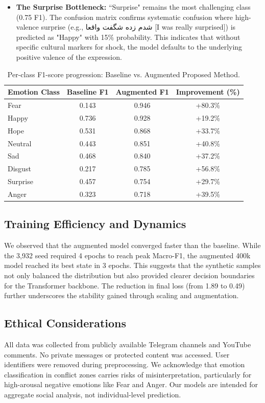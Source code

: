 \documentclass[runningheads]{llncs}
\newcommand{\textfarsi}[1]{{\foreignlanguage{arabic}{#1}}\xspace}
\begin{document}
\begin{itemize}
\item \textbf{The Surprise Bottleneck:} ``Surprise" remains the most challenging 
class (0.75 F1). The confusion matrix confirms systematic confusion where 
high-valence surprise (e.g., \textfarsi{شدم زده شگفت واقعا} [I was really surprised]) is  predicted as "Happy"  with 15\% probability. This 
indicates that without specific cultural markers for shock, the model defaults 
to the underlying positive valence of the expression.
\end{itemize}

\begin{table}[htbp]
\centering
\caption{Per-class F1-score progression: Baseline vs. Augmented Proposed Method.}
\label{tab:class_f1}
\begin{tabular}{@{}lccc@{}}
\toprule
\textbf{Emotion Class} & \textbf{Baseline F1} & \textbf{Augmented F1} & \textbf{Improvement (\%)} \\ \midrule
Fear & 0.143 & 0.946 & +80.3\% \\
Happy & 0.736 & 0.928 & +19.2\% \\
Hope & 0.531 & 0.868 & +33.7\% \\
Neutral & 0.443 & 0.851 & +40.8\% \\
Sad & 0.468 & 0.840 & +37.2\% \\
Disgust & 0.217 & 0.785 & +56.8\% \\
Surprise & 0.457 & 0.754 & +29.7\% \\
Anger & 0.323 & 0.718 & +39.5\% \\ \bottomrule
\end{tabular}
\end{table}
\subsection{Training Efficiency and Dynamics}
We observed that the augmented model converged faster than the baseline. While the 3,932 seed required 4 epochs to reach peak Macro-F1, the augmented 400k model reached its best state in 3 epochs. This suggests that the synthetic samples not only balanced the distribution but also provided clearer decision boundaries for the Transformer backbone. The reduction in final loss (from 1.89 to 0.49) further underscores the stability gained through scaling and augmentation.
\subsection{Ethical Considerations}
All data was collected from publicly available Telegram channels and YouTube 
comments. No private messages or protected content was accessed. User 
identifiers were removed during preprocessing. We acknowledge that emotion 
classification in conflict zones carries risks of misinterpretation, 
particularly for high-arousal negative emotions like Fear and Anger. Our 
models are intended for aggregate social analysis, not individual-level 
prediction.
\end{document}
